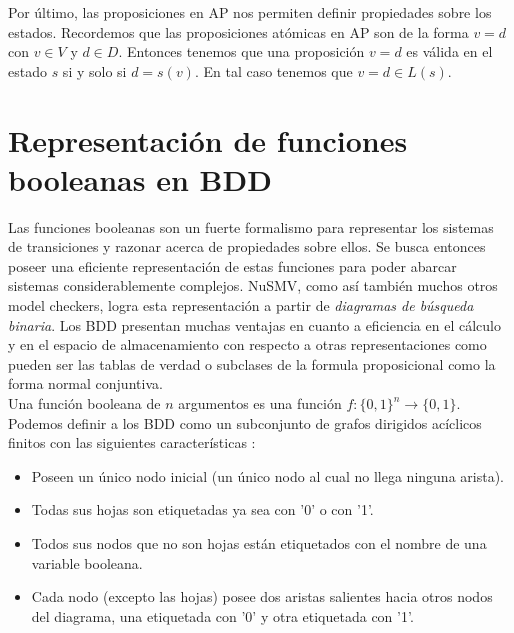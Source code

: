 \documentclass[titlepage, 12pt]{book}
\begin{document}
Por \'ultimo, las proposiciones en AP nos permiten definir propiedades sobre los estados. Recordemos que las proposiciones at\'omicas en AP son de la forma $v=d$ con $v \in V$ y $d \in D$. Entonces tenemos que una proposici\'on $v=d$ es v\'alida en el estado $s$ si y solo si $d = s(v)$. En tal caso tenemos que $v=d \in L(s)$.








\section{Representaci\'on de funciones booleanas en BDD}
\label{boolBDD}

Las funciones booleanas son un fuerte formalismo para representar los sistemas de transiciones y razonar acerca de propiedades sobre ellos. Se busca entonces poseer una eficiente representaci\'on de estas funciones para poder abarcar sistemas considerablemente complejos. NuSMV, como as\'i tambi\'en muchos otros model checkers, logra esta representaci\'on a partir de \textit{diagramas de b\'usqueda binaria}. Los BDD presentan muchas ventajas en cuanto a eficiencia en el c\'alculo y en el espacio de almacenamiento con respecto a otras representaciones como pueden ser las tablas de verdad o subclases de la formula proposicional como la forma normal conjuntiva.\\

Una funci\'on booleana de $n$ argumentos es una funci\'on $f : \{0,1\}^n \to \{0,1\}$. Podemos definir a los BDD como un subconjunto de grafos dirigidos ac\'iclicos finitos con las siguientes caracter\'isticas \cite{Huth}:
\begin{itemize}
\item Poseen un \'unico nodo inicial (un \'unico nodo al cual no llega ninguna arista).
\item Todas sus hojas son etiquetadas ya sea con '0' o con '1'.
\item Todos sus nodos que no son hojas est\'an etiquetados con el nombre de una variable booleana.
\item Cada nodo (excepto las hojas) posee dos aristas salientes hacia otros nodos del diagrama, una etiquetada con '0' y otra etiquetada con '1'.
\end{itemize}
\end{document}
